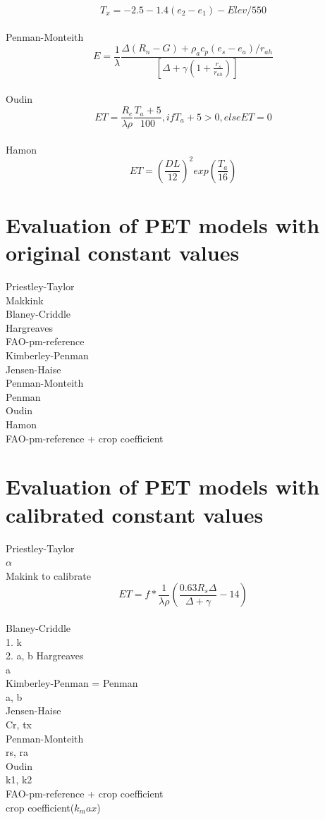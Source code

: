\documentclass[hydrology,article,submit,moreauthors,pdftex]{Definitions/mdpi}
\begin{document}
\begin{equation}
T_x = -2.5 - 1.4 (e_2-e_1) - Elev/550
\end{equation}
\\
Penman-Monteith \cite{asce2005asce}
\begin{equation}
E = \frac{1}{\lambda} \frac{\Delta (R_{n}-G)+ \rho_a c_p  (e_{s}-e_{a})/r_{ah}}{\left[ \Delta +\gamma (1+\frac{r_s}{r_{ah}})\right]}
\end{equation}
\\
Oudin \cite{oudin2005potential}
\begin{equation}
ET = \frac{R_e}{\lambda \rho} \frac{T_a+5}{100}, if T_a + 5 > 0, else ET = 0
\end{equation}
\\
Hamon \cite{oudin2005potential}
\begin{equation}
ET = \left(\frac{DL}{12}\right)^2 exp \left(\frac{T_a}{16}\right)
\end{equation}
\section{Evaluation of PET models with original constant values}
Priestley-Taylor \\
Makkink \\
Blaney-Criddle \\
Hargreaves \\
FAO-pm-reference \\
Kimberley-Penman \\
Jensen-Haise \\
Penman-Monteith \\
Penman \\
Oudin \\
Hamon \\
FAO-pm-reference + crop coefficient \\

\section{Evaluation of PET models with calibrated constant values}

Priestley-Taylor \\
$\alpha$
\\
Makink to calibrate \cite{asce2005asce}
\begin{equation}
ET = f * \frac{1}{\lambda \rho} \left(\frac{0.63 R_s \Delta}{\Delta+\gamma}-14 \right)
\end{equation}
\\
Blaney-Criddle \\
1. k \\
2. a, b 
Hargreaves \\
a \\
Kimberley-Penman = Penman \\
a, b \\
Jensen-Haise \\
Cr, tx \\
Penman-Monteith \\
rs, ra \\
Oudin \\
k1, k2 \\
FAO-pm-reference + crop coefficient \\
crop coefficient($k_max$) 
\end{document}
